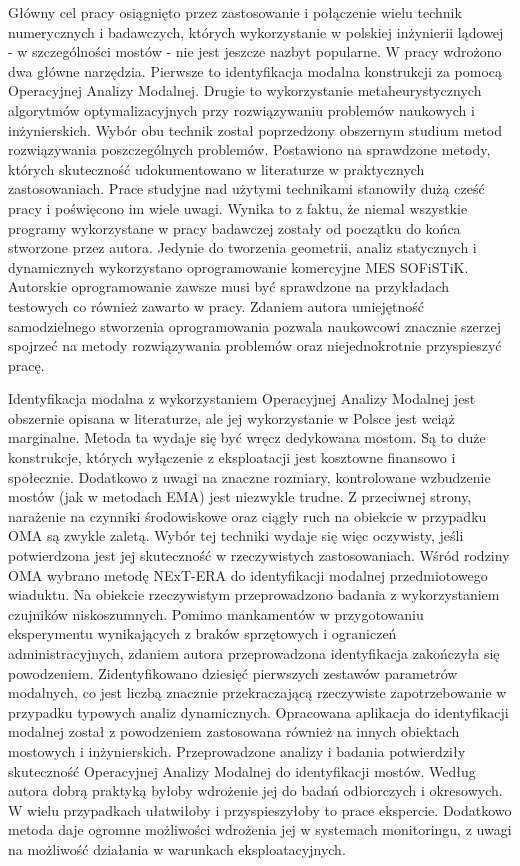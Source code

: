 Główny cel pracy osiągnięto przez zastosowanie i połączenie wielu technik numerycznych i badawczych, których wykorzystanie w polskiej inżynierii lądowej - w szczególności mostów - nie jest jeszcze nazbyt popularne. W pracy wdrożono dwa główne narzędzia. Pierwsze to identyfikacja modalna konstrukcji za pomocą Operacyjnej Analizy Modalnej. Drugie to wykorzystanie metaheurystycznych algorytmów optymalizacyjnych przy rozwiązywaniu problemów naukowych i inżynierskich. Wybór obu technik został poprzedzony obszernym studium metod rozwiązywania poszczególnych problemów. Postawiono na sprawdzone metody, których skuteczność udokumentowano w literaturze w praktycznych zastosowaniach. Prace studyjne nad użytymi technikami stanowiły dużą cześć pracy i poświęcono im wiele uwagi. Wynika to z faktu, że niemal wszystkie programy wykorzystane w pracy badawczej zostały od początku do końca stworzone przez autora. Jedynie do tworzenia geometrii, analiz statycznych i dynamicznych wykorzystano oprogramowanie komercyjne MES SOFiSTiK. Autorskie oprogramowanie zawsze musi być sprawdzone na przykładach testowych co również zawarto w pracy. Zdaniem autora umiejętność samodzielnego stworzenia oprogramowania pozwala naukowcowi znacznie szerzej spojrzeć na metody rozwiązywania problemów oraz niejednokrotnie przyspieszyć pracę.

Identyfikacja modalna z wykorzystaniem Operacyjnej Analizy Modalnej jest obszernie opisana w literaturze, ale jej wykorzystanie w Polsce jest wciąż marginalne. Metoda ta wydaje się być wręcz dedykowana mostom. Są to duże konstrukcje, których wyłączenie z eksploatacji jest kosztowne finansowo i społecznie. Dodatkowo z uwagi na znaczne rozmiary, kontrolowane wzbudzenie mostów (jak w metodach EMA) jest niezwykle trudne. Z przeciwnej strony, narażenie na czynniki środowiskowe oraz ciągły ruch na obiekcie w przypadku OMA są zwykle zaletą. Wybór tej techniki wydaje się więc oczywisty, jeśli potwierdzona jest jej skuteczność w rzeczywistych zastosowaniach. Wśród rodziny OMA wybrano metodę NExT-ERA do identyfikacji modalnej przedmiotowego wiaduktu. Na obiekcie rzeczywistym przeprowadzono badania z wykorzystaniem czujników niskoszumnych. Pomimo mankamentów w przygotowaniu eksperymentu wynikających z braków sprzętowych i ograniczeń administracyjnych, zdaniem autora przeprowadzona identyfikacja zakończyła się powodzeniem. Zidentyfikowano dziesięć pierwszych zestawów parametrów modalnych, co jest liczbą znacznie przekraczającą rzeczywiste zapotrzebowanie w przypadku typowych analiz dynamicznych. Opracowana aplikacja do identyfikacji modalnej został z powodzeniem zastosowana również na innych obiektach mostowych i inżynierskich. Przeprowadzone analizy i badania potwierdziły skuteczność Operacyjnej Analizy Modalnej do identyfikacji mostów. Według autora dobrą praktyką byłoby wdrożenie jej do badań odbiorczych i okresowych. W wielu przypadkach ułatwiłoby i przyspieszyłoby to prace ekspercie. Dodatkowo metoda daje ogromne możliwości wdrożenia jej w systemach monitoringu, z uwagi na możliwość działania w warunkach eksploatacyjnych.

